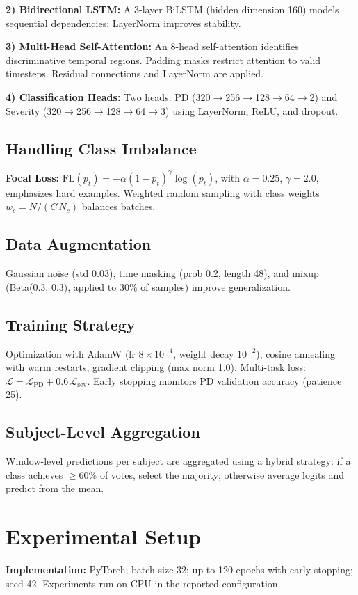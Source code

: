 \documentclass[conference]{IEEEtran}
\begin{document}
\textbf{2) Bidirectional LSTM:} A 3-layer BiLSTM (hidden dimension 160) models sequential dependencies; LayerNorm improves stability.

\textbf{3) Multi-Head Self-Attention:} An 8-head self-attention identifies discriminative temporal regions. Padding masks restrict attention to valid timesteps. Residual connections and LayerNorm are applied.

\textbf{4) Classification Heads:} Two heads: PD (320$\rightarrow$256$\rightarrow$128$\rightarrow$64$\rightarrow$2) and Severity (320$\rightarrow$256$\rightarrow$128$\rightarrow$64$\rightarrow$3) using LayerNorm, ReLU, and dropout.

\subsection{Handling Class Imbalance}
\textbf{Focal Loss:} \(\mathrm{FL}(p_t) = -\alpha (1-p_t)^{\gamma} \log(p_t)\), with \(\alpha=0.25\), \(\gamma=2.0\), emphasizes hard examples. Weighted random sampling with class weights \(w_c = N/(C\,N_c)\) balances batches.

\subsection{Data Augmentation}
Gaussian noise (std 0.03), time masking (prob 0.2, length 48), and mixup (Beta(0.3, 0.3), applied to 30\% of samples) improve generalization.

\subsection{Training Strategy}
Optimization with AdamW (lr $8\times 10^{-4}$, weight decay $10^{-2}$), cosine annealing with warm restarts, gradient clipping (max norm 1.0). Multi-task loss: \(\mathcal{L}=\mathcal{L}_{\text{PD}} + 0.6\,\mathcal{L}_{\text{sev}}\). Early stopping monitors PD validation accuracy (patience 25).

\subsection{Subject-Level Aggregation}
Window-level predictions per subject are aggregated using a hybrid strategy: if a class achieves $\geq 60\%$ of votes, select the majority; otherwise average logits and predict from the mean.

\section{Experimental Setup}
\textbf{Implementation:} PyTorch; batch size 32; up to 120 epochs with early stopping; seed 42. Experiments run on CPU in the reported configuration.
\end{document}
